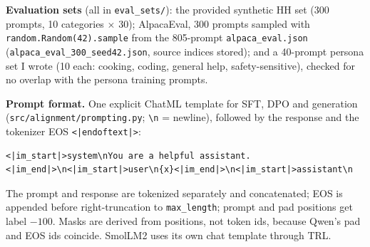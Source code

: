 \documentclass[10pt]{article}
\begin{document}
\textbf{Evaluation sets} (all in \texttt{eval\_sets/}): the provided synthetic HH set (300 prompts, 10 categories $\times$ 30); AlpacaEval, 300 prompts sampled with \texttt{random.\allowbreak Random(42).sample} from the 805-prompt \texttt{alpaca\_eval.json} (\texttt{alpaca\_eval\_300\_\allowbreak seed42.json}, source indices stored); and a 40-prompt persona set I wrote (10 each: cooking, coding, general help, safety-sensitive), checked for no overlap with the persona training prompts.

\textbf{Prompt format.} One explicit ChatML template for SFT, DPO and generation (\texttt{src/alignment/prompting.py}; \texttt{\textbackslash n} = newline), followed by the response and the tokenizer EOS \texttt{<|endoftext|>}:
\begin{Verbatim}[fontsize=\footnotesize,xleftmargin=1em]
<|im_start|>system\nYou are a helpful assistant.<|im_end|>\n<|im_start|>user\n{x}<|im_end|>\n<|im_start|>assistant\n
\end{Verbatim}
The prompt and response are tokenized separately and concatenated; EOS is appended before right-truncation to \texttt{max\_length}; prompt and pad positions get label $-100$. Masks are derived from positions, not token ids, because Qwen's pad and EOS ids coincide. SmolLM2 uses its own chat template through TRL.
\end{document}
